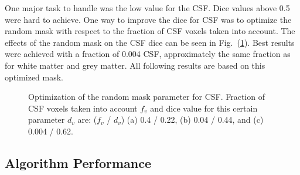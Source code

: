 \documentclass[journal]{IEEEtran}
\begin{document}
One major task to handle was the low value for the CSF. Dice values above 0.5 were hard to achieve. One way to improve the dice for CSF was to optimize the random mask with respect to the fraction of CSF voxels taken into account. The effects of the random mask on the CSF dice can be seen in Fig.~(\ref{f.random_mask}). Best results were achieved with a fraction of 0.004 CSF, approximately the same fraction as for white matter and grey matter. All following results are based on this optimized mask.
\begin{figure}[h!]
	\centering
	\hfill
	\hfill
	\caption{Optimization of the random mask parameter for CSF. Fraction of CSF voxels taken into account $f_v$ and dice value for this certain parameter $d_v$ are: ($f_v$ / $d_v$) (a) 0.4 / 0.22, (b) 0.04 / 0.44, and (c) 0.004 / 0.62.}
	\label{f.random_mask}
\end{figure}


\subsection{Algorithm Performance}
\end{document}
